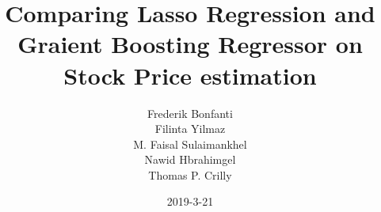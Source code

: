 \documentclass{article}
\title{Comparing Lasso Regression and Graient Boosting Regressor on Stock Price estimation}
\date{2019-3-21}
\author{Frederik Bonfanti \\ Filinta Yilmaz \\ M. Faisal Sulaimankhel \\ Nawid Hbrahimgel \\ Thomas P. Crilly}
\begin{document}
\maketitle






{}

\end{document}
